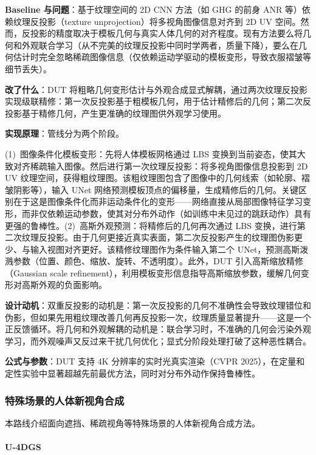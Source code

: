 \textbf{Baseline 与问题}：基于纹理空间的 2D CNN 方法（如 GHG 的前身 ANR 等）依赖纹理反投影（texture unprojection）将多视角图像信息对齐到 2D UV 空间。然而，反投影的精度取决于模板几何与真实人体几何的对齐程度。现有方法要么将几何和外观联合学习（从不完美的纹理反投影中同时学两者，质量下降），要么在几何估计时完全忽略稀疏图像信息（仅依赖运动学驱动的模板变形，导致衣服褶皱等细节丢失）。

\textbf{改了什么}：DUT 将粗略几何变形估计与外观合成显式解耦，通过两次纹理反投影实现级联精修：第一次反投影基于粗模板几何，用于估计精修后的几何；第二次反投影基于精修几何，产生更准确的纹理图供外观学习使用。

\textbf{实现原理}：管线分为两个阶段。

(1)~图像条件化模板变形：先将人体模板网格通过 LBS 变换到当前姿态，使其大致对齐稀疏输入图像。然后进行第一次纹理反投影：将多视角图像信息投影到 2D UV 纹理空间，获得粗纹理图。该粗纹理图包含了图像中的几何线索（如轮廓、褶皱阴影等），输入 UNet 网络预测模板顶点的偏移量，生成精修后的几何。关键区别在于这是图像条件化而非运动条件化的变形——网络直接从局部图像特征学习变形，而非仅依赖运动参数，使其对分布外动作（如训练中未见过的跳跃动作）具有更强的鲁棒性。(2)~高斯外观预测：将精修后的几何再次通过 LBS 变换，进行第二次纹理反投影。由于几何更接近真实表面，第二次反投影产生的纹理图伪影更少、与输入视图对齐更好。该精修纹理图作为条件输入第二个 UNet，预测高斯泼溅参数（位置、颜色、缩放、旋转、不透明度）。此外，DUT 引入高斯缩放精修（Gaussian scale refinement），利用模板变形信息指导高斯缩放参数，缓解几何变形对高斯外观的负面影响。

\textbf{设计动机}：双重反投影的动机是：第一次反投影的几何不准确性会导致纹理错位和伪影，但如果先用粗纹理改善几何再反投影一次，纹理质量显著提升——这是一个正反馈循环。将几何和外观解耦的动机是：联合学习时，不准确的几何会污染外观学习，而外观噪声又反过来干扰几何优化；显式分阶段处理打破了这种恶性耦合。

\textbf{公式与参数}：DUT 支持 4K 分辨率的实时光真实渲染（CVPR 2025），在定量和定性实验中显著超越先前最优方法，同时对分布外动作保持鲁棒性。

\subsubsection{特殊场景的人体新视角合成}

本路线介绍面向遮挡、稀疏视角等特殊场景的人体新视角合成方法。

\paragraph{U-4DGS}

